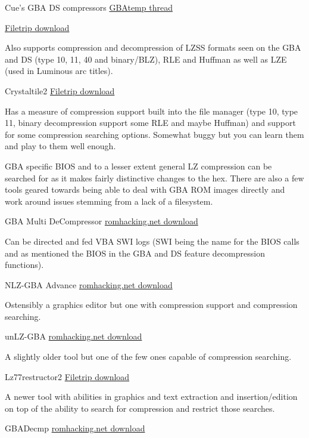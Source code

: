 \documentclass[
]{book}
\begin{document}
Cue's GBA DS compressors \href{http://gbatemp.net/topic/313278-nintendo-dsgba-compressors/}{GBAtemp thread}

\href{http://filetrip.net/nds-downloads/utilities/download-cues-gba-ds-compressors-10-f29010.html}{Filetrip download}

Also supports compression and decompression of LZSS formats seen on the GBA and DS (type 10, 11, 40 and binary/BLZ), RLE and Huffman as well as LZE (used in Luminous arc titles).

Crystaltile2 \href{http://filetrip.net/f23649-CrystalTile2-2010-09-06.html}{Filetrip download}

Has a measure of compression support built into the file manager (type 10, type 11, binary decompression support some RLE and maybe Huffman) and support for some compression searching options. Somewhat buggy but you can learn them and play to them well enough.

GBA specific BIOS and to a lesser extent general LZ compression can be searched for as it makes fairly distinctive changes to the hex. There are also a few tools geared towards being able to deal with GBA ROM images directly and work around issues stemming from a lack of a filesystem.

GBA Multi DeCompressor \href{http://www.romhacking.net/utilities/431/}{romhacking.net download}

Can be directed and fed VBA SWI logs (SWI being the name for the BIOS calls and as mentioned the BIOS in the GBA and DS feature decompression functions).

NLZ-GBA Advance \href{http://www.romhacking.net/utilities/529/}{romhacking.net download}

Ostensibly a graphics editor but one with compression support and compression searching.

unLZ-GBA \href{http://www.romhacking.net/utilities/362/}{romhacking.net download}

A slightly older tool but one of the few ones capable of compression searching.

Lz77restructor2 \href{http://filetrip.net/gba-downloads/tools-utilities/latest-lz77restructor2-f29641.html}{Filetrip download}

A newer tool with abilities in graphics and text extraction and insertion/edition on top of the ability to search for compression and restrict those searches.

GBADecmp \href{http://www.romhacking.net/utilities/433/}{romhacking.net download}
\end{document}
